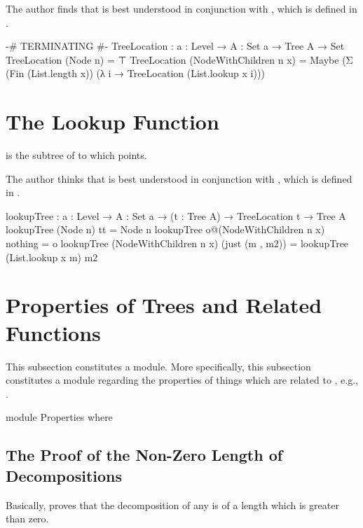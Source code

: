 \documentclass{report}
\begin{document}
The author finds that  is best understood in conjunction with , which is defined in .

\begin{code}
  {-# TERMINATING #-}
  TreeLocation : {a : Level} → {A : Set a} → Tree A → Set
  TreeLocation (Node n) = ⊤
  TreeLocation (NodeWithChildren n x) =
    Maybe (Σ (Fin (List.length x)) (λ i → TreeLocation (List.lookup x i)))
\end{code}

\section{The Lookup Function}\label{sec:lookupTreeDefinition}
   is the subtree of  to which  points.

The author thinks that  is best understood in conjunction with , which is defined in .

\begin{code}
  lookupTree : {a : Level} → {A : Set a} → (t : Tree A) → TreeLocation t → Tree A
  lookupTree (Node n) tt = Node n
  lookupTree o@(NodeWithChildren n x) nothing = o
  lookupTree (NodeWithChildren n x) (just (m , m2)) =
    lookupTree (List.lookup x m) m2
\end{code}

\section{Properties of Trees and Related Functions}
This subsection constitutes a module.  More specifically, this subsection constitutes a module regarding the properties of things which are related to , e.g., .

\begin{code}
  module Properties where
\end{code}

\subsection{The Proof of the Non-Zero Length of Decompositions}
Basically,  proves that the decomposition of any  is of a length which is greater than zero.
\end{document}

